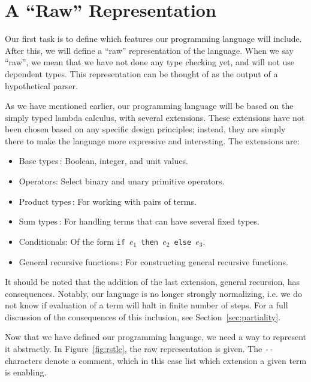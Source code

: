\section{A ``Raw'' Representation}
\label{sec:the-simply-typed-lambda-calculus}

Our first task is to define which features our programming language will include. After this, we will define a ``raw'' representation of the language. When we say ``raw'', we mean that we have not done any type checking yet, and will not use dependent types. This representation can be thought of as the output of a hypothetical parser. 

As we have mentioned earlier, our programming language will be based on the simply typed lambda calculus, with several extensions. These extensions have not been chosen based on any specific design principles; instead, they are simply there to make the language more expressive and interesting. The extensions are:
\begin{itemize}
\item Base types\,\cite[pp. 117]{Pierce:TypeSystems}: Boolean, integer, and unit values.
\item Operators: Select binary and unary primitive operators.
\item Product types\,\cite[pp. 126]{Pierce:TypeSystems}: For working with pairs of terms.
\item Sum types\,\cite[pp. 132]{Pierce:TypeSystems}: For handling terms that can have several fixed types.
\item Conditionals: Of the form \texttt{if $e_{1}$ then $e_{2}$ else $e_{3}$}.
\item General recursive functions\,\cite[pp. 142]{Pierce:TypeSystems}: For constructing general recursive functions.
\end{itemize}

It should be noted that the addition of the last extension, general recursion, has consequences. Notably, our language is no longer strongly normalizing, i.e. we do not know if evaluation of a term will halt in finite number of steps. For a full discussion of the consequences of this inclusion, see Section~\ref{sec:partiality}.

Now that we have defined our programming language, we need a way to represent it abstractly. In Figure~\ref{fig:rstlc}, the raw representation is given. The \verb+--+ characters denote a comment, which in this case list which extension a given term is enabling.

